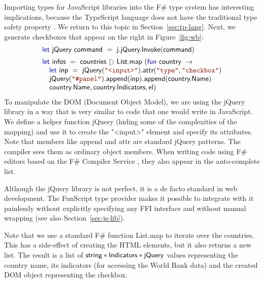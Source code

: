\documentclass[submission,copyright,creativecommons]{eptcs}
\newcommand{\rang}{\begin{picture}(5,7)
\put(.1,2.5){\rotatebox{135}{\line(1,0){6.0}}}
\put(.1,2.5){\rotatebox{225}{\line(1,0){6.0}}}
\end{picture}}
\newcommand{\kvd}[1]{\textnormal{\textcolor{kvdclr}{\sffamily #1}}}
\newcommand{\str}[1]{\textnormal{\textcolor{strclr}{\ttfamily "#1"}}}
\newcommand{\ident}[1]{\textnormal{\sffamily #1}}
\begin{document}
Importing types for JavaScript libraries into the F\# type system has interesting implications, 
because the TypeScript language does not have the traditional type safety property \cite{ms-safets}.
We return to this topic in Section~\ref{sec:tp-lang}. Next, we generate checkboxes that appear on the 
right in Figure~\ref{fig:wb}:
%
\begin{equation*}
\begin{array}{lll}
 \kvd{let}~\ident{jQuery}~\ident{command}~=~\ident{j.jQuery.Invoke}(\ident{command}) 
 \\[0.5em]
 \kvd{let}~\ident{infos}~=~\ident{countries}~|\rang~\ident{List.map}~(\kvd{fun}~\ident{country}~\rightarrow \\
 \quad \kvd{let}~\ident{inp}~=~\ident{jQuery}(\str{<input>})\ident{.attr}(\str{type}, \str{checkbox}) \\
 \quad \ident{jQuery}(\str{\#panel})\ident{.append}(\ident{inp})\ident{.append}(\ident{country.Name}) \\
 \quad \ident{country.Name}, \ident{country.Indicators}, \ident{el}) \\
\end{array}
\end{equation*}
%
To manipulate the DOM (Document Object Model), we are using the jQuery library in a way that is
very similar to code that one would write in JavaScript. We define a helper function \ident{jQuery}
(hiding some of the complexities of the mapping) and use it to create the \str{<input>} element and
specify its attributes. Note that members like \ident{append} and \ident{attr} are standard 
jQuery patterns. The compiler sees them as ordinary object members. When writing code using F\# editors
based on the F\# Compiler Service \cite{fsharp-fcs}, they also appear in the auto-complete list.

Although the jQuery library is not perfect, it is a de facto standard in web development. The 
FunScript type provider makes it possible to integrate with it painlessly without explicitly 
specifying any FFI interface and without manual wrapping (see also Section~\ref{sec:js-lib}). 

Note that we use a standard F\# function \ident{List.map} to iterate over the countries. This has 
a side-effect of creating the HTML elements, but it also returns a new list. The result is a list 
of $\ident{string}\ast\ident{Indicators}\ast\ident{jQuery}$ values representing the country name,
its indicators (for accessing the World Bank data) and the created DOM object representing the
checkbox.
\end{document}
